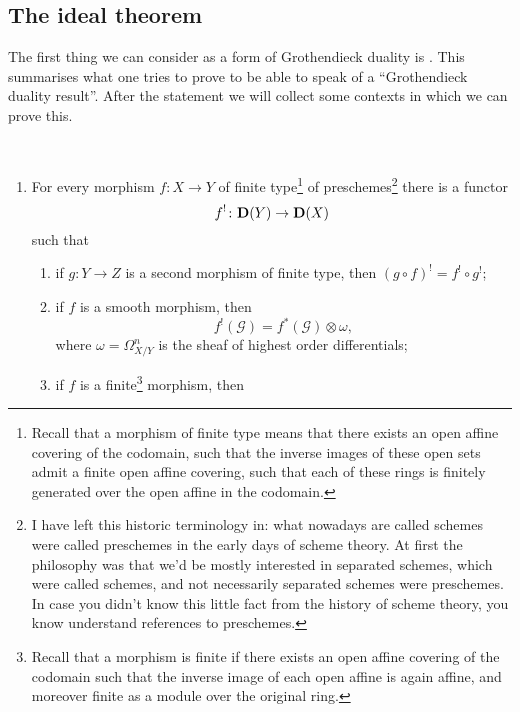 \subsection{The ideal theorem}
The first thing we can consider as a form of Grothendieck duality is \cite[Ideal theorem on page 6]{hartshorne-residues-and-duality}. This summarises what one tries to prove to be able to speak of a ``Grothendieck duality result''. After the statement we will collect some contexts in which we can prove this.
\begin{theorem} {\ }
  \label{theorem:classical}
  \begin{enumerate}
    \item\label{enumerate:classical-a} For every morphism $f\colon X\to Y$ of finite type\footnote{Recall that a morphism of finite type means that there exists an open affine covering of the codomain, such that the inverse images of these open sets admit a finite open affine covering, such that each of these rings is finitely generated over the open affine in the codomain.} of preschemes\footnote{I have left this historic terminology in: what nowadays are called schemes were called preschemes in the early days of scheme theory. At first the philosophy was that we'd be mostly interested in separated schemes, which were called schemes, and not necessarily separated schemes were preschemes. In case you didn't know this little fact from the history of scheme theory, you know understand references to preschemes.} there is a functor
      \begin{equation}
        \label{equation:f-upper-shriek}
        f^!\colon\mathbf{D}(Y)\to\mathbf{D}(X)
      \end{equation}
      such that
      \begin{enumerate}
        \item\label{enumerate:classical-a-1} if $g\colon Y\to Z$ is a second morphism of finite type, then $(g\circ f)^!=f^!\circ g^!$;
        \item\label{enumerate:classical-a-2} if $f$ is a smooth morphism, then
          \begin{equation}
            f^!(\mathcal{G})=f^*(\mathcal{G})\otimes\omega,
          \end{equation}
          where $\omega=\Omega_{X/Y}^n$ is the sheaf of highest order differentials;
        \item\label{enumerate:classical-a-3} if $f$ is a finite\footnote{Recall that a morphism is finite if there exists an open affine covering of the codomain such that the inverse image of each open affine is again affine, and moreover finite as a module over the original ring.} morphism, then

\end{enumerate}
\end{enumerate}
\end{theorem}
